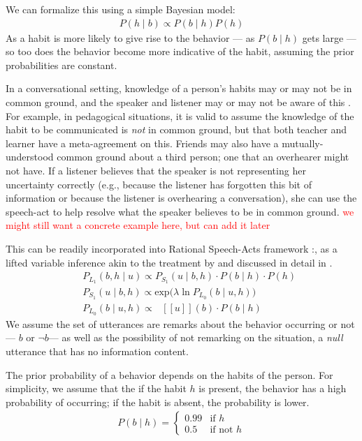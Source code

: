 \documentclass[10pt,letterpaper]{article}
\newcommand{\denote}[1]{\mbox{ $[\![ #1 ]\!]$}}
\newcommand{\red}[1]{\textcolor{Red}{#1}}
\begin{document}
We can formalize this using a simple Bayesian model:
\begin{eqnarray}
P(h \mid b) \propto P(b \mid h) P(h) \label{eq:bayes}
\end{eqnarray}
As a habit is more likely to give rise to the behavior --- as $P(b \mid h)$ gets large --- so too does the behavior become more indicative of the habit, assuming the prior probabilities are constant. 

In a conversational setting, knowledge of a person's habits may or may not be in common ground, and the speaker and listener may or may not be aware of this \cite{Clark1977, Clark1996}. 
For example, in pedagogical situations, it is valid to assume the knowledge of the habit to be communicated is \emph{not} in common ground, but that both teacher and learner have a meta-agreement on this.
Friends may also have a mutually-understood common ground about a third person; one that an overhearer might not have. 
If a listener believes that the speaker is not representing her uncertainty correctly (e.g., because the listener has forgotten this bit of information or because the listener is overhearing a conversation), she can use the speech-act to help resolve what the speaker believes to be in common ground. 
\red{we might still want a concrete example here, but can add it later}

This can be readily incorporated into Rational Speech-Acts framework \cite{Frank2012, Goodman2013}:, as a lifted variable inference akin to the treatment by  and discussed in detail in .
%
\begin{eqnarray}
&&P_{L_1}(b, h \mid u)\propto P_{S_1}(u \mid b, h)\cdot P(b \mid h) \cdot P(h) \label{eq:L1}\\
&&P_{S_1}(u \mid b, h) \propto \mathrm{exp}({\lambda \ln P_{L_0}(b \mid u, h))} \label{eq:S1}\\
&&P_{L_0}(b \mid u, h)\propto \denote{u}(b) \cdot P(b \mid h) \label{eq:L0}
\end{eqnarray}
%
We assume the set of utterances are remarks about the behavior occurring or not --- $b$ or $\neg b$--- as well as the possibility of not remarking on the situation, a \emph{null} utterance that has no information content.  

The prior probability of a behavior depends on the habits of the person. For simplicity, we assume that the if the habit $h$ is present, the behavior has a high probability of occurring; if the habit is absent, the probability is lower. 
\begin{eqnarray}
P(b \mid h) = \begin{cases}
0.99  & \text{if } h\\
0.5  & \text{if not } h
\end{cases} \label{eq:hab}
\end{eqnarray}
\end{document}
